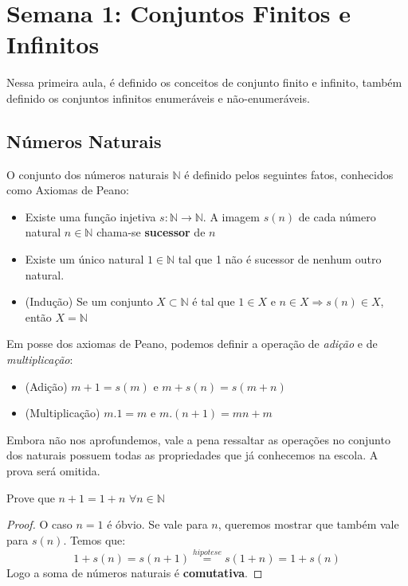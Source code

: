\section{Semana 1: Conjuntos Finitos e Infinitos}

Nessa primeira aula, é definido os conceitos de conjunto finito e infinito, também definido os conjuntos infinitos enumeráveis e não-enumeráveis.

\subsection{Números Naturais}
O conjunto dos números naturais $\mathbb{N}$ é definido pelos seguintes fatos, conhecidos como Axiomas de Peano:

\begin{theorem}
\begin{itemize}
    \item Existe uma função injetiva $s:\mathbb{N}\rightarrow \mathbb{N}$. A imagem $s(n)$ de cada número natural $n \in \mathbb{N}$ chama-se \textbf{sucessor} de $n$
    \item Existe um único natural $1 \in \mathbb{N}$ tal que 1 não é sucessor de nenhum outro natural.
    \item (Indução) Se um conjunto $X\subset \mathbb{N}$ é tal que $1 \in X$ e $n\in X\Rightarrow s(n)\in X$, então $X=\mathbb{N}$
\end{itemize}
\end{theorem}
Em posse dos axiomas de Peano, podemos definir a operação de \textit{adição} e de \textit{multiplicação}:
\begin{itemize}
    \item (Adição) $m+1=s(m)$ e $m+s(n)=s(m+n)$
    \item (Multiplicação) $m.1=m$ e $m.(n+1)=mn+m$
\end{itemize}

Embora não nos aprofundemos, vale a pena ressaltar as operações no conjunto dos naturais possuem todas as propriedades que já conhecemos na escola. A prova será omitida.


\begin{prob}
Prove que $n+1=1+n$ $\forall n \in \mathbb{N}$
\end{prob}

\begin{proof}
O caso $n=1$ é óbvio. Se vale para $n$, queremos mostrar que também vale para $s(n)$. Temos que: $$1+s(n)=s(n+1)\overset{hipotese}{=}s(1+n)=1+s(n)$$
Logo a soma de números naturais é \textbf{comutativa}.
\end{proof}

